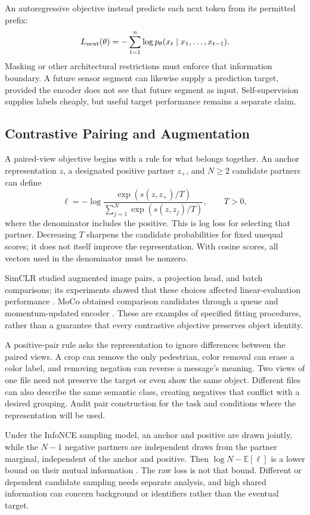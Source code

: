An autoregressive objective instead predicts each next token from its permitted prefix:
\[
L_{\rm next}(\theta)=-\sum_{t=1}^n
\log p_\theta(x_t\mid x_1,\ldots,x_{t-1}).
\]
Masking or other architectural restrictions must enforce that information boundary. A future sensor segment can likewise supply a prediction target, provided the encoder does not see that future segment as input. Self-supervision supplies labels cheaply, but useful target performance remains a separate claim.

\subsection{Contrastive Pairing and Augmentation}

A paired-view objective begins with a rule for what belongs together. An anchor representation $z$, a designated positive partner $z_+$, and $N\ge2$ candidate partners can define
\[
\ell=-\log
\frac{\exp(s(z,z_+)/T)}{\sum_{j=1}^N\exp(s(z,z_j)/T)},
\qquad T>0,
\]
where the denominator includes the positive. This is log loss for selecting that partner. Decreasing $T$ sharpens the candidate probabilities for fixed unequal scores; it does not itself improve the representation. With cosine scores, all vectors used in the denominator must be nonzero.

SimCLR studied augmented image pairs, a projection head, and batch comparisons; its experiments showed that these choices affected linear-evaluation performance \citep{chen2020simclr}. MoCo obtained comparison candidates through a queue and momentum-updated encoder \citep{he2020moco}. These are examples of specified fitting procedures, rather than a guarantee that every contrastive objective preserves object identity.

A positive-pair rule asks the representation to ignore differences between the paired views. A crop can remove the only pedestrian, color removal can erase a color label, and removing negation can reverse a message's meaning. Two views of one file need not preserve the target or even show the same object. Different files can also describe the same semantic class, creating negatives that conflict with a desired grouping. Audit pair construction for the task and conditions where the representation will be used.

Under the InfoNCE sampling model, an anchor and positive are drawn jointly, while the $N-1$ negative partners are independent draws from the partner marginal, independent of the anchor and positive. Then $\log N-\mathbb E[\ell]$ is a lower bound on their mutual information \citep{oord2018cpc}. The raw loss is not that bound. Different or dependent candidate sampling needs separate analysis, and high shared information can concern background or identifiers rather than the eventual target.

